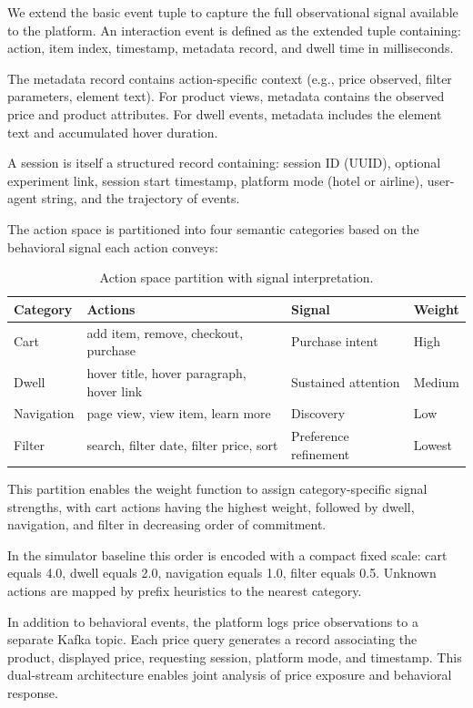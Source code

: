 We extend the basic event tuple to capture the full observational signal available to the platform. An interaction event is defined as the extended tuple containing: action, item index, timestamp, metadata record, and dwell time in milliseconds.

The metadata record contains action-specific context (e.g., price observed, filter parameters, element text). For product views, metadata contains the observed price and product attributes. For dwell events, metadata includes the element text and accumulated hover duration.

A session is itself a structured record containing: session ID (UUID), optional experiment link, session start timestamp, platform mode (hotel or airline), user-agent string, and the trajectory of events.

The action space is partitioned into four semantic categories based on the behavioral signal each action conveys:

\begin{table}[ht]
\centering
\caption{Action space partition with signal interpretation.}
\label{tab:action_space}
\begin{tabular}{@{}llll@{}}
\toprule
\textbf{Category} & \textbf{Actions} & \textbf{Signal} & \textbf{Weight} \\
\midrule
Cart & add item, remove, checkout, purchase & Purchase intent & High \\
Dwell & hover title, hover paragraph, hover link & Sustained attention & Medium \\
Navigation & page view, view item, learn more & Discovery & Low \\
Filter & search, filter date, filter price, sort & Preference refinement & Lowest \\
\bottomrule
\end{tabular}
\end{table}

This partition enables the weight function to assign category-specific signal strengths, with cart actions having the highest weight, followed by dwell, navigation, and filter in decreasing order of commitment.

In the simulator baseline this order is encoded with a compact fixed scale: cart equals 4.0, dwell equals 2.0, navigation equals 1.0, filter equals 0.5. Unknown actions are mapped by prefix heuristics to the nearest category.

In addition to behavioral events, the platform logs price observations to a separate Kafka topic. Each price query generates a record associating the product, displayed price, requesting session, platform mode, and timestamp. This dual-stream architecture enables joint analysis of price exposure and behavioral response.

